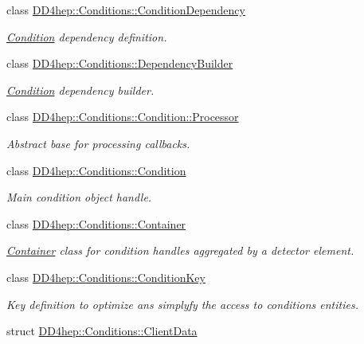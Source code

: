 \begin{DoxyCompactItemize}
class \hyperlink{class_d_d4hep_1_1_conditions_1_1_condition_dependency}{D\+D4hep\+::\+Conditions\+::\+Condition\+Dependency}
\begin{DoxyCompactList}\small\item\em \hyperlink{class_d_d4hep_1_1_conditions_1_1_condition}{Condition} dependency definition. \end{DoxyCompactList}\item 
class \hyperlink{class_d_d4hep_1_1_conditions_1_1_dependency_builder}{D\+D4hep\+::\+Conditions\+::\+Dependency\+Builder}
\begin{DoxyCompactList}\small\item\em \hyperlink{class_d_d4hep_1_1_conditions_1_1_condition}{Condition} dependency builder. \end{DoxyCompactList}\item 
class \hyperlink{class_d_d4hep_1_1_conditions_1_1_condition_1_1_processor}{D\+D4hep\+::\+Conditions\+::\+Condition\+::\+Processor}
\begin{DoxyCompactList}\small\item\em Abstract base for processing callbacks. \end{DoxyCompactList}\item 
class \hyperlink{class_d_d4hep_1_1_conditions_1_1_condition}{D\+D4hep\+::\+Conditions\+::\+Condition}
\begin{DoxyCompactList}\small\item\em Main condition object handle. \end{DoxyCompactList}\item 
class \hyperlink{class_d_d4hep_1_1_conditions_1_1_container}{D\+D4hep\+::\+Conditions\+::\+Container}
\begin{DoxyCompactList}\small\item\em \hyperlink{class_d_d4hep_1_1_conditions_1_1_container}{Container} class for condition handles aggregated by a detector element. \end{DoxyCompactList}\item 
class \hyperlink{class_d_d4hep_1_1_conditions_1_1_condition_key}{D\+D4hep\+::\+Conditions\+::\+Condition\+Key}
\begin{DoxyCompactList}\small\item\em Key definition to optimize ans simplyfy the access to conditions entities. \end{DoxyCompactList}\item 
struct \hyperlink{struct_d_d4hep_1_1_conditions_1_1_client_data}{D\+D4hep\+::\+Conditions\+::\+Client\+Data}

\end{DoxyCompactItemize}
